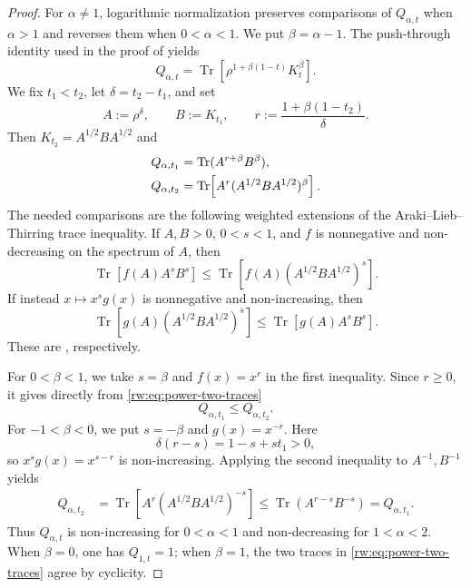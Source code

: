 \documentclass[11pt]{article}
\theoremstyle{remark}
\newcommand{\1}{\mathbbm{1}}
\begin{document}
\begin{proof}
For $\alpha\neq1$, logarithmic normalization preserves comparisons of
$Q_{\alpha,t}$ when $\alpha>1$ and reverses them when $0<\alpha<1$.
We put $\beta=\alpha-1$.  The push-through identity used in the proof
of  yields
\begin{equation}
 Q_{\alpha,t}
 =\operatorname{Tr}\!\left[
 \rho^{1+\beta(1-t)}K_t^\beta\right].
 \label{rw:eq:power-reduction-one}
\end{equation}
We fix $t_1<t_2$, let $\delta=t_2-t_1$, and set
\begin{equation}
 A:=\rho^\delta,\qquad B:=K_{t_1},\qquad
 r:=\frac{1+\beta(1-t_2)}{\delta}.
 \label{rw:eq:power-reduction-parameters}
\end{equation}
Then $K_{t_2}=A^{1/2}BA^{1/2}$ and
\begin{align}
 Q_{\alpha,t_1}
 &=\operatorname{Tr}(A^{r+\beta}B^\beta),
 \notag\\
 Q_{\alpha,t_2}
 &=\operatorname{Tr}\!\left[
 A^r(A^{1/2}BA^{1/2})^\beta\right].
 \label{rw:eq:power-two-traces}
\end{align}
The needed comparisons are the following weighted extensions of the
Araki--Lieb--Thirring trace inequality.  If $A,B>0$, $0<s<1$, and
$f$ is nonnegative and non-decreasing on the spectrum of $A$, then
\begin{equation*}
 \operatorname{Tr}\!\left[f(A)A^sB^s\right]
 \leq
 \operatorname{Tr}\!\left[
 f(A)(A^{1/2}BA^{1/2})^s\right].
\end{equation*}
If instead $x\mapsto x^s g(x)$ is nonnegative and non-increasing,
then
\begin{equation*}
 \operatorname{Tr}\!\left[
 g(A)(A^{1/2}BA^{1/2})^s\right]
 \leq
 \operatorname{Tr}\!\left[g(A)A^sB^s\right].
\end{equation*}
These are \cite[Theorem~4 and Proposition~5]{liu2026araki},
respectively.

For \underline{$0<\beta<1$}, we take $s=\beta$ and $f(x)=x^r$ in the first
inequality.  Since $r\geq0$, it gives directly from
\eqref{rw:eq:power-two-traces}
\begin{equation*}
 Q_{\alpha,t_1}\leq Q_{\alpha,t_2}.
\end{equation*}
For \underline{$-1<\beta<0$}, we put $s=-\beta$ and
$g(x)=x^{-r}$.  Here
\begin{equation*}
 \delta(r-s)=1-s+st_1>0,
\end{equation*}
so $x^sg(x)=x^{s-r}$ is non-increasing.  Applying the second
inequality to $A^{-1},B^{-1}$ yields
\begin{align*}
 Q_{\alpha,t_2}
 &=\operatorname{Tr}\!\left[
   A^r(A^{1/2}BA^{1/2})^{-s}\right]\leq \operatorname{Tr}(A^{r-s}B^{-s})
 =Q_{\alpha,t_1}.
\end{align*}
Thus $Q_{\alpha,t}$ is non-increasing for $0<\alpha<1$ and
non-decreasing for $1<\alpha<2$.  When $\beta=0$, one has
$Q_{1,t}=1$; when $\beta=1$, the two traces in
\eqref{rw:eq:power-two-traces} agree by cyclicity.


\end{proof}
\end{document}

